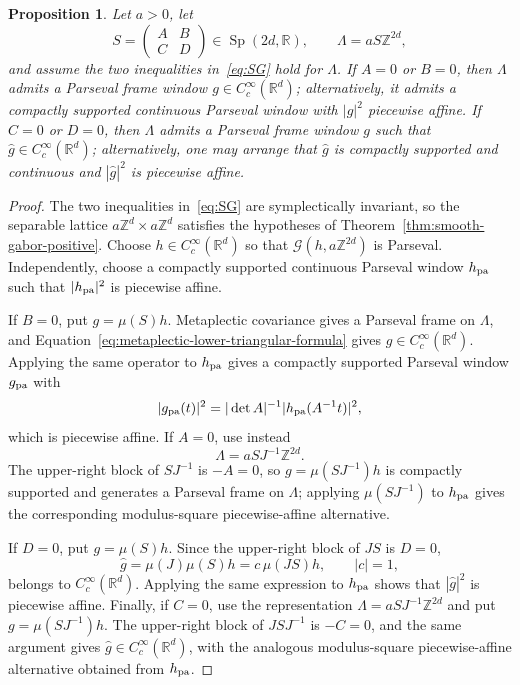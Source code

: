 \documentclass[11pt,reqno]{amsart}
\numberwithin{equation}{section}
\newtheorem{proposition}[theorem]{Proposition}
\theoremstyle{definition}
\theoremstyle{remark}
\newcommand{\R}{\mathbb R}
\newcommand{\Z}{\mathbb Z}
\newcommand{\C}{\mathbb C}
\newcommand{\G}{\mathcal G}
\newcommand{\Sp}{\operatorname{Sp}}
\begin{document}
\begin{proposition}\label{prop:symplectic-lattice-support-refinement}
Let $a>0$, let
\[
 S=\begin{pmatrix}A&B\\C&D\end{pmatrix}\in\Sp(2d,\R),
 \qquad \Lambda=aS\Z^{2d},
\]
and assume the two inequalities in~\eqref{eq:SG} hold for $\Lambda$.  If
$A=0$ or $B=0$, then $\Lambda$ admits a Parseval frame window
$g\in C_c^\infty(\R^d)$; alternatively, it admits a compactly supported
continuous Parseval window with $|g|^2$ piecewise affine.  If $C=0$ or
$D=0$, then $\Lambda$ admits a Parseval frame window $g$ such that
$\widehat g\in C_c^\infty(\R^d)$; alternatively, one may arrange that
$\widehat g$ is compactly supported and continuous and
$|\widehat g|^2$ is piecewise affine.
\end{proposition}

\begin{proof}
The two inequalities in~\eqref{eq:SG} are symplectically invariant, so the
separable lattice $a\Z^d\times a\Z^d$ satisfies the hypotheses of
Theorem~\ref{thm:smooth-gabor-positive}.  Choose
$h\in C_c^\infty(\R^d)$ so that $\G(h,a\Z^{2d})$ is Parseval.  Independently,
choose a compactly supported continuous Parseval window $h_{\rm pa}$ such
that $|h_{\rm pa}|^2$ is piecewise affine.

If $B=0$, put $g=\mu(S)h$.  Metaplectic covariance gives a Parseval frame
on $\Lambda$, and
Equation~\eqref{eq:metaplectic-lower-triangular-formula} gives
$g\in C_c^\infty(\R^d)$.  Applying the same operator to $h_{\rm pa}$ gives a
compactly supported Parseval window $g_{\rm pa}$ with
\[
 |g_{\rm pa}(t)|^2
 =|\det A|^{-1}|h_{\rm pa}(A^{-1}t)|^2,
\]
which is piecewise affine.  If $A=0$, use instead
\[
 \Lambda=aSJ^{-1}\Z^{2d}.
\]
The upper-right block of $SJ^{-1}$ is $-A=0$, so
$g=\mu(SJ^{-1})h$ is compactly supported and generates a Parseval frame on
$\Lambda$; applying $\mu(SJ^{-1})$ to $h_{\rm pa}$ gives the corresponding
modulus-square piecewise-affine alternative.

If $D=0$, put $g=\mu(S)h$.  Since the upper-right block of $JS$ is
$D=0$,
\[
 \widehat g=\mu(J)\mu(S)h=c\,\mu(JS)h,
 \qquad |c|=1,
\]
belongs to $C_c^\infty(\R^d)$.  Applying the same expression to
$h_{\rm pa}$ shows that $|\widehat g|^2$ is piecewise affine.  Finally, if
$C=0$, use the representation $\Lambda=aSJ^{-1}\Z^{2d}$ and put
$g=\mu(SJ^{-1})h$.  The upper-right block of $JSJ^{-1}$ is $-C=0$, and the
same argument gives $\widehat g\in C_c^\infty(\R^d)$, with the analogous
modulus-square piecewise-affine alternative obtained from $h_{\rm pa}$.
\end{proof}
\end{document}
